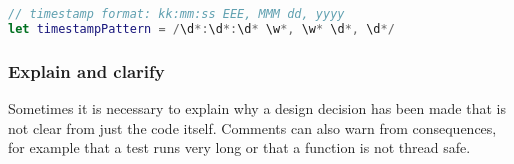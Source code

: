 \begin{lstlisting}[language=Swift, caption={A useful comment describing a regular expression}]
// timestamp format: kk:mm:ss EEE, MMM dd, yyyy
let timestampPattern = /\d*:\d*:\d* \w*, \w* \d*, \d*/
\end{lstlisting}

\subsubsection{Explain and clarify}
Sometimes it is necessary to explain why a design decision has been made that is not clear from just the code itself. Comments can also warn from consequences, for example that a test runs very long or that a function is not thread safe.